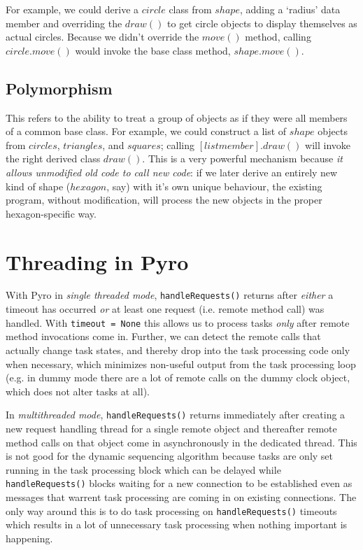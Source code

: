 \documentclass[11pt,a4paper]{report}
\begin{document}
For example, we could derive a $circle$ class from $shape$, adding a
`radius' data member and overriding the $draw()$ to get circle objects
to display themselves as actual circles.  Because we didn't override the
$move()$ method, calling $circle.move()$ would invoke the base class
method, $shape.move()$. 


\section{Polymorphism}

This refers to the ability to treat a group of objects as if they were
all members of a common base class.  For example, we could construct a
list of $shape$ objects from $circles$, $triangles$, and $squares$;
calling $[list member].draw()$ will invoke the right derived class
$draw()$. This is a very powerful mechanism because {\em it allows
unmodified old code to call new code}: if we later derive an entirely
new kind of shape ($hexagon$, say) with it's own unique behaviour, the
existing program, without modification, will process the new objects in
the proper hexagon-specific way.


\chapter{Threading in Pyro} \label{pyro-appendix}

With Pyro in {\em single threaded mode}, \verb#handleRequests()# returns
after {\em either} a timeout has occurred {\em or} at least one request
(i.e.  remote method call) was handled. With \verb#timeout = None# this
allows us to process tasks {\em only} after remote method invocations
come in.  Further, we can detect the remote calls that actually change
task states, and thereby drop into the task processing code only when
necessary, which minimizes non-useful output from the task processing
loop (e.g. in dummy mode there are a lot of remote calls on the dummy
clock object, which does not alter tasks at all). 

In {\em multithreaded mode}, \verb#handleRequests()# returns immediately
after creating a new request handling thread for a single remote object
and thereafter remote method calls on that object come in asynchronously
in the dedicated thread. This is not good for the dynamic sequencing
algorithm because tasks are only set running in the task processing
block which can be delayed while \verb#handleRequests()# blocks waiting
for a new connection to be established even as messages that warrent
task processing are coming in on existing connections. The only way
around this is to do task processing on \verb#handleRequests()# timeouts
which results in a lot of unnecessary task processing when nothing
important is happening.
\end{document}
